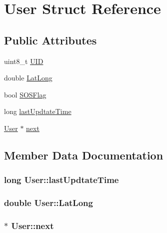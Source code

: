 \hypertarget{struct_user}{}\section{User Struct Reference}
\label{struct_user}
\subsection*{Public Attributes}
\begin{DoxyCompactItemize}
\item 
uint8\+\_\+t \hyperlink{struct_user_ab95507be7717a9c2ba7023d1473b57db}{U\+ID}
\item 
double \hyperlink{struct_user_a81116a5340fe958f25bda1a6d1e7a8be}{Lat\+Long}
\item 
bool \hyperlink{struct_user_a4047dfbd01104d59e949f43695b191c8}{S\+O\+S\+Flag}
\item 
long \hyperlink{struct_user_a1ad43b05be5389a0d85bce2ac5c76cf8}{last\+Updtate\+Time}
\item 
\hyperlink{struct_user}{User} $\ast$ \hyperlink{struct_user_a68c6426b7a5a9d60645c64706c6af2ec}{next}
\end{DoxyCompactItemize}


\subsection{Member Data Documentation}
\subsubsection[{\texorpdfstring{last\+Updtate\+Time}{lastUpdtateTime}}]{\setlength{\rightskip}{0pt plus 5cm}long User\+::last\+Updtate\+Time}\hypertarget{struct_user_a1ad43b05be5389a0d85bce2ac5c76cf8}{}\label{struct_user_a1ad43b05be5389a0d85bce2ac5c76cf8}
\subsubsection[{\texorpdfstring{Lat\+Long}{LatLong}}]{\setlength{\rightskip}{0pt plus 5cm}double User\+::\+Lat\+Long}\hypertarget{struct_user_a81116a5340fe958f25bda1a6d1e7a8be}{}\label{struct_user_a81116a5340fe958f25bda1a6d1e7a8be}
\subsubsection[{\texorpdfstring{next}{next}}]{$\ast$ User\+::next}\hypertarget{struct_user_a68c6426b7a5a9d60645c64706c6af2ec}{}\label{struct_user_a68c6426b7a5a9d60645c64706c6af2ec}
